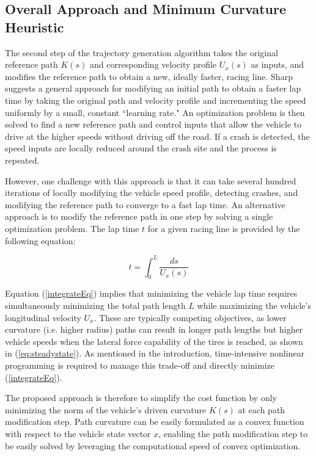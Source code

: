 \documentclass[twocolumn,10pt]{asme2ej}
\begin{document}
\subsection{Overall Approach and Minimum Curvature Heuristic}
The second step of the trajectory generation algorithm takes the original reference path $K(s)$ and corresponding velocity profile $U_x(s)$
as inputs, and modifies the reference path to obtain a new, ideally faster, racing line. Sharp \cite{sharp} suggests a general approach for modifying 
an initial path to obtain a faster lap time by taking the original path and velocity profile and incrementing the speed uniformly
by a small, constant ``learning rate." An optimization problem is then solved to find a new reference path and control inputs that allow the vehicle to
drive at the higher speeds without driving off the road. If a crash is detected, the speed inputs are locally reduced around the crash site and the process is repeated.

However, one challenge with this approach is that it can take several hundred iterations of locally modifying the vehicle speed profile, detecting crashes, and 
 modifying the reference path to converge to a fast lap time. An alternative approach is to modify the reference path in one step by solving a single 
 optimization problem. The lap time $t$ for a given racing line is provided by the following equation: 
 
 \begin{equation}
t = \int_0^L\frac{ds}{U_x(s)}
\label{integrateEq}
\end{equation}
 
 Equation (\ref{integrateEq}) implies that minimizing the vehicle lap time requires simultaneously minimizing the total path length $L$ while maximizing
 the vehicle's longitudinal velocity $U_x$. These are typically competing objectives, as lower curvature (i.e. higher radius) paths can result in longer path lengths but higher
 vehicle speeds when the lateral force capability of the tires is reached, as shown in (\ref{eq:steadystate}). As mentioned in the introduction, time-intensive nonlinear programming
 is required to manage this trade-off and directly minimize (\ref{integrateEq}). 
 
 The proposed approach is therefore to simplify the cost function by only minimizing the norm of the vehicle's driven curvature
 $K(s)$ at each path modification step. Path curvature can be easily formulated as a convex function with respect to the vehicle state vector $x$, 
 enabling the path modification step to be easily solved by leveraging the computational speed of convex optimization. 
 
\end{document}
